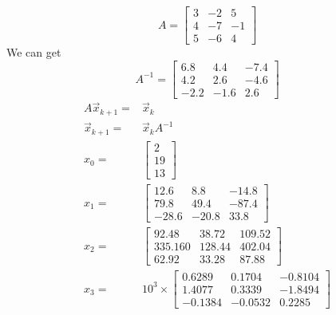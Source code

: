 \documentclass{article}
\begin{document}
        \subsection{}
            $$A=\begin{bmatrix}
                3&-2&5\\
                4&-7&-1\\
                5&-6&4
            \end{bmatrix}$$
            We can get 
            $$A^{-1}=
                \begin{bmatrix}
                    6.8&4.4&-7.4\\
                    4.2&2.6&-4.6\\
                    -2.2&-1.6&2.6
                \end{bmatrix}
            $$
            \begin{equation*}
                \begin{split}
                    A\vec{x}_{k+1}=&\vec{x}_{k}\\
                    \vec{x}_{k+1}=&\vec{x}_kA^{-1}\\
                    x_0=&\begin{bmatrix}
                        2\\19\\13
                    \end{bmatrix}\\
                    x_1=&\begin{bmatrix}
                        12.6&8.8&-14.8\\
                        79.8&49.4&-87.4\\
                        -28.6&-20.8&33.8
                    \end{bmatrix}\\
                    x_2=&\begin{bmatrix}
                        92.48  & 38.72&  109.52\\
                        335.160&  128.44&  402.04\\
                         62.92 & 33.28  & 87.88
                    \end{bmatrix}\\
                    x_3=&10^3\times \begin{bmatrix}
                        0.6289  &  0.1704  & -0.8104\\
                        1.4077  &  0.3339 &  -1.8494\\
                       -0.1384 &  -0.0532 &   0.2285
                    \end{bmatrix}
                \end{split}
            \end{equation*}
\end{document}
